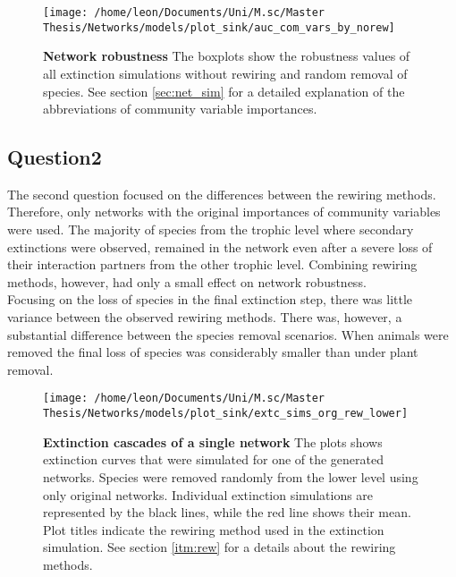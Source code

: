 \documentclass[12pt,a4paper]{article}
\begin{document}
\begin{figure}[H]
	 \texttt{[image: /home/leon/Documents/Uni/M.sc/Master Thesis/Networks/models/plot\_sink/auc\_com\_vars\_by\_norew]}
	 \caption{\textbf{Network robustness } The boxplots show the robustness values of all extinction simulations without rewiring and random removal of species. See section \ref{sec:net_sim} for a detailed explanation of the abbreviations of community variable importances.}
	 \label{fig:auc_cv_norew}
\end{figure}



\subsection{Question2}

The second question focused on the differences between the rewiring methods. Therefore, only networks with the original importances of community variables were used. The majority of species from the trophic level where secondary extinctions were observed, remained in the network even after a severe loss of their interaction partners from the other trophic level. Combining rewiring methods, however, had only a small effect on network robustness.\\ Focusing on the loss of species in the final extinction step, there was little variance between the observed rewiring methods. There was, however, a substantial difference between the species removal scenarios. When animals were removed the final loss of species was considerably smaller than under plant removal. \par

\begin{figure}[H]
	 \texttt{[image: /home/leon/Documents/Uni/M.sc/Master Thesis/Networks/models/plot\_sink/extc\_sims\_org\_rew\_lower]}
	 \caption{\textbf{Extinction cascades of a single network} The plots shows extinction curves that were simulated for one of the generated networks. Species were removed randomly from the lower level using only original networks. Individual extinction simulations are represented by the black lines, while the red line shows their mean. Plot titles indicate the rewiring method used in the extinction simulation. See section \ref{itm:rew} for a details about the rewiring methods.}
	 \label{fig:extc_org_rew_lower}
\end{figure}
\end{document}

